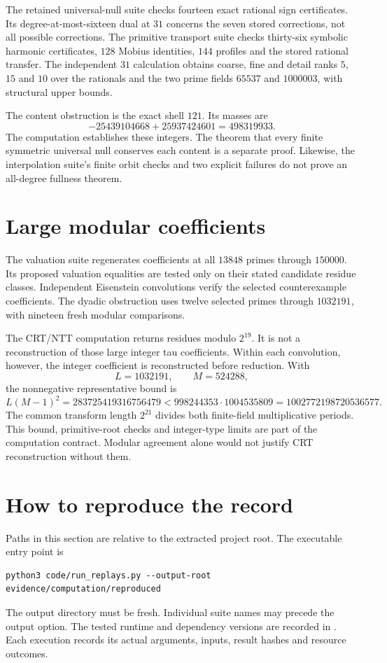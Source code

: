 The retained universal-null suite checks fourteen exact rational sign certificates. Its degree-at-most-sixteen dual at $31$ concerns the seven stored corrections, not all possible corrections. The primitive transport suite checks thirty-six symbolic harmonic certificates, $128$ Mobius identities, $144$ profiles and the stored rational transfer. The independent $31$ calculation obtains coarse, fine and detail ranks $5$, $15$ and $10$ over the rationals and the two prime fields $65537$ and $1000003$, with structural upper bounds.

The content obstruction is the exact shell $121$. Its masses are
\[
-25439104668+25937424601=498319933.
\]
The computation establishes these integers. The theorem that every finite symmetric universal null conserves each content is a separate proof. Likewise, the interpolation suite's finite orbit checks and two explicit failures do not prove an all-degree fullness theorem.

\section{Large modular coefficients}
The valuation suite regenerates coefficients at all $13848$ primes through $150000$. Its proposed valuation equalities are tested only on their stated candidate residue classes. Independent Eisenstein convolutions verify the selected counterexample coefficients. The dyadic obstruction uses twelve selected primes through $1032191$, with nineteen fresh modular comparisons.

The CRT/NTT computation returns residues modulo $2^{19}$. It is not a reconstruction of those large integer tau coefficients. Within each convolution, however, the integer coefficient is reconstructed before reduction. With
\[
L=1032191,\qquad M=524288,
\]
the nonnegative representative bound is
\[
L(M-1)^2=283725419316756479
 <998244353\cdot1004535809
 =1002772198720536577.
\]
The common transform length $2^{21}$ divides both finite-field multiplicative periods. This bound, primitive-root checks and integer-type limits are part of the computation contract. Modular agreement alone would not justify CRT reconstruction without them.

\section{How to reproduce the record}
Paths in this section are relative to the extracted project root. The executable entry point is
\begin{lstlisting}[basicstyle=\ttfamily\small,breaklines=true]
python3 code/run_replays.py --output-root evidence/computation/reproduced
\end{lstlisting}
The output directory must be fresh. Individual suite names may precede the output option. The tested runtime and dependency versions are recorded in . Each execution records its actual arguments, inputs, result hashes and resource outcomes.

